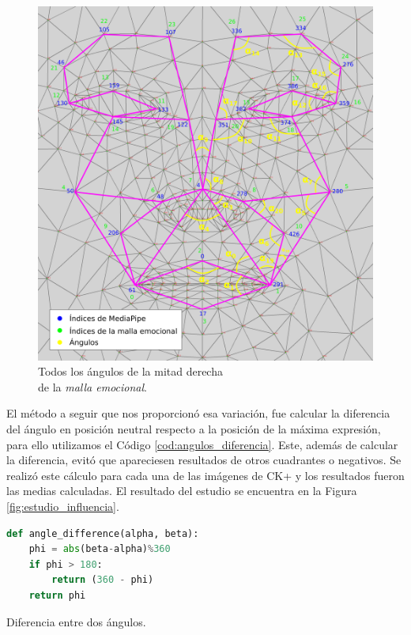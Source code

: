 \begin{figure} [h!]
  \begin{center}
    \includegraphics[width=13cm]{figs/emotional_mesh_todos_angulos.png}
  \end{center}
  \captionsetup{justification=centering}
  \caption{Todos los ángulos de la mitad derecha\\
  de la \textit{malla emocional}.}
  \label{fig:emotional_mesh_todos_angulos}
\end{figure}

El método a seguir que nos proporcionó esa variación, fue calcular la diferencia del ángulo en posición neutral respecto a la posición de la máxima expresión, para ello utilizamos el Código \ref{cod:angulos_diferencia}. Este, además de calcular la diferencia, evitó que apareciesen resultados de otros cuadrantes o negativos. Se realizó este cálculo para cada una de las imágenes de CK+ y los resultados fueron las medias calculadas. El resultado del estudio se encuentra en la Figura \ref{fig:estudio_influencia}.\\

\begin{code}[h]
\begin{lstlisting}[language=Python]
def angle_difference(alpha, beta):
    phi = abs(beta-alpha)%360
    if phi > 180:
        return (360 - phi)
    return phi
\end{lstlisting}
\captionsetup{justification=centering}
\caption[Diferencia entre dos ángulos.]{Diferencia entre dos ángulos.}
\label{cod:angulos_diferencia}
\end{code}


